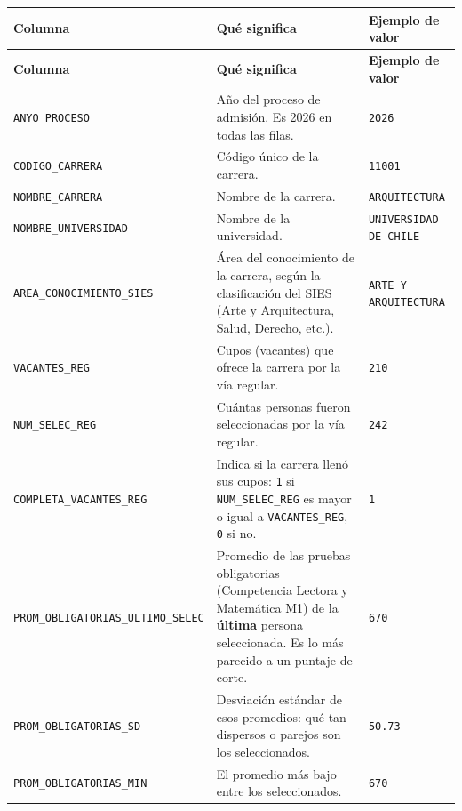 \documentclass[10.5pt]{article}
\newcommand{\hdr}[1]{\textbf{\color{white}#1}}
\begin{document}
\begin{xltabular}{\linewidth}{@{}p{4.5cm} >{\raggedright\arraybackslash}X p{3.4cm}@{}}
\hdr{Columna} & \hdr{Qué significa} & \hdr{Ejemplo de valor} \\
\endfirsthead
{}\hdr{Columna} & \hdr{Qué significa} & \hdr{Ejemplo de valor} \\
\endhead
\texttt{ANYO\_\allowbreak{}PROCESO} & Año del proceso de admisión. Es 2026 en todas las filas. & \texttt{2026} \\
\texttt{CODIGO\_\allowbreak{}CARRERA} & Código único de la carrera. & \texttt{11001} \\
\texttt{NOMBRE\_\allowbreak{}CARRERA} & Nombre de la carrera. & \texttt{ARQUITECTURA} \\
\texttt{NOMBRE\_\allowbreak{}UNIVERSIDAD} & Nombre de la universidad. & \texttt{UNIVERSIDAD DE CHILE} \\
\texttt{AREA\_\allowbreak{}CONOCIMIENTO\_\allowbreak{}SIES} & Área del conocimiento de la carrera, según la clasificación del SIES (Arte y Arquitectura, Salud, Derecho, etc.). & \texttt{ARTE Y ARQUITECTURA} \\
\texttt{VACANTES\_\allowbreak{}REG} & Cupos (vacantes) que ofrece la carrera por la vía regular. & \texttt{210} \\
\texttt{NUM\_\allowbreak{}SELEC\_\allowbreak{}REG} & Cuántas personas fueron seleccionadas por la vía regular. & \texttt{242} \\
\texttt{COMPLETA\_\allowbreak{}VACANTES\_\allowbreak{}REG} & Indica si la carrera llenó sus cupos: \texttt{1} si \texttt{NUM\_\allowbreak{}SELEC\_\allowbreak{}REG} es mayor o igual a \texttt{VACANTES\_\allowbreak{}REG}, \texttt{0} si no. & \texttt{1} \\
\texttt{PROM\_\allowbreak{}OBLIGATORIAS\_\allowbreak{}ULTIMO\_\allowbreak{}SELEC} & Promedio de las pruebas obligatorias (Competencia Lectora y Matemática M1) de la \textbf{última} persona seleccionada. Es lo más parecido a un puntaje de corte. & \texttt{670} \\
\texttt{PROM\_\allowbreak{}OBLIGATORIAS\_\allowbreak{}SD} & Desviación estándar de esos promedios: qué tan dispersos o parejos son los seleccionados. & \texttt{50.73} \\
\texttt{PROM\_\allowbreak{}OBLIGATORIAS\_\allowbreak{}MIN} & El promedio más bajo entre los seleccionados. & \texttt{670} \\

\end{xltabular}
\end{document}
